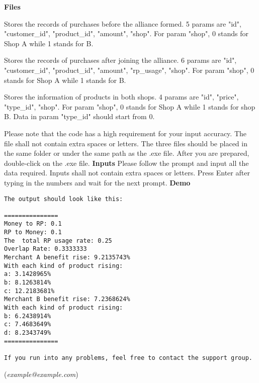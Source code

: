 \sffamily
\textbf{\large Files}

\begin{enumerate}

Stores the records of purchases before the alliance formed. 5 params are "id", "customer\_id", "product\_id", "amount", "shop". For param "shop", 0 stands for Shop A while 1 stands for B.


Stores the records of purchases after joining the alliance. 6 params are "id", "customer\_id", "product\_id", "amount", "rp\_usage", "shop". For param "shop", 0 stands for Shop A while 1 stands for B.


Stores the information of products in both shops. 4 params are "id", "price", "type\_id", "shop". For param "shop", 0 stands for Shop A while 1 stands for shop B. Data in param "type\_id" should start from 0.
\end{enumerate}

Please note that the code has a high requirement for your input accuracy. The file shall not contain extra spaces or letters.
\newline \newline
The three files should be placed in the same folder or under the same path as the .exe file.
\newline \newline
After you are prepared, double-click on the .exe file.
\newline \newline
\textbf{\large Inputs}
\newline \newline
Please follow the prompt and input all the data required. Inputs shall not contain extra spaces or letters. Press Enter after typing in the numbers and wait for the next prompt.
\newline \newline
\textbf{\large Demo}
\begin{lstlisting}[basicstyle=\sffamily]
The output should look like this:

===============
Money to RP: 0.1
RP to Money: 0.1
The  total RP usage rate: 0.25
Overlap Rate: 0.3333333
Merchant A benefit rise: 9.2135743%
With each kind of product rising:
a: 3.1428965%
b: 8.1263814%
c: 12.2183681%
Merchant B benefit rise: 7.2368624%
With each kind of product rising:
b: 6.2438914%
c: 7.4683649%
d: 8.2343749%
===============

If you run into any problems, feel free to contact the support group. 
\end{lstlisting}
(\textit{example@example.com})
\rmfamily